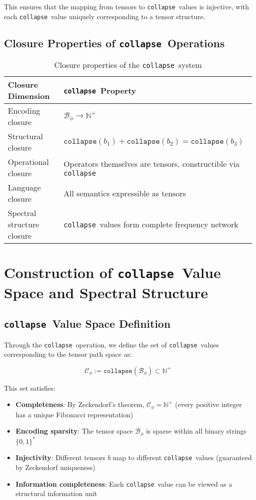 \documentclass[12pt,a4paper]{article}
\theoremstyle{plain}
\theoremstyle{definition}
\theoremstyle{remark}
\newcommand{\collapse}{\texttt{collapse}}
\newcommand{\Bphi}{\mathcal{B}_\phi}
\newcommand{\Cphi}{\mathcal{C}_\phi}
\newcommand{\N}{\mathbb{N}}
\begin{document}
This ensures that the mapping from tensors to \collapse\ values is injective, with each \collapse\ value uniquely corresponding to a tensor structure.

\subsection{Closure Properties of \collapse\ Operations}

\begin{table}[h]
\centering
\begin{tabular}{@{}ll@{}}
\toprule
Closure Dimension & \collapse\ Property \\
\midrule
Encoding closure & $\Bphi \to \N^+$ \\
Structural closure & $\collapse(b_1) + \collapse(b_2) = \collapse(b_3)$ \\
Operational closure & Operators themselves are tensors, constructible via \collapse \\
Language closure & All semantics expressible as tensors \\
Spectral structure closure & \collapse\ values form complete frequency network \\
\bottomrule
\end{tabular}
\caption{Closure properties of the \collapse\ system}
\end{table}

\section{Construction of \collapse\ Value Space and Spectral Structure}

\subsection{\collapse\ Value Space Definition}

Through the \collapse\ operation, we define the set of \collapse\ values corresponding to the tensor path space as:

\begin{equation}
\Cphi := \collapse(\Bphi) \subset \N^+
\end{equation}

This set satisfies:

\begin{itemize}
\item \textbf{Completeness}: By Zeckendorf's theorem, $\Cphi = \N^+$ (every positive integer has a unique Fibonacci representation)
\item \textbf{Encoding sparsity}: The tensor space $\Bphi$ is sparse within all binary strings $\{0,1\}^*$
\item \textbf{Injectivity}: Different tensors $b$ map to different \collapse\ values (guaranteed by Zeckendorf uniqueness)
\item \textbf{Information completeness}: Each \collapse\ value can be viewed as a structural information unit
\end{itemize}
\end{document}
